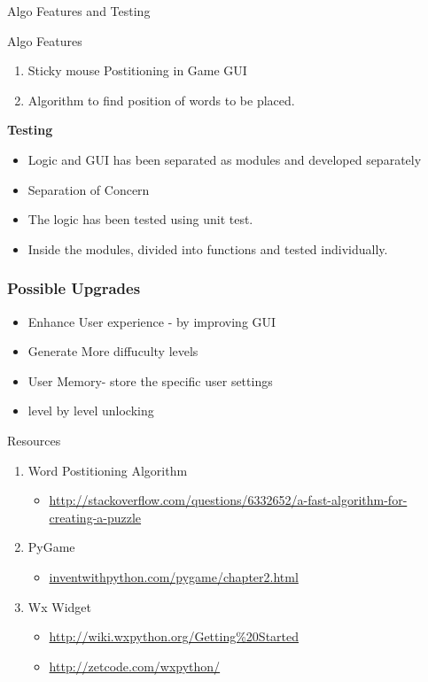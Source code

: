 \documentclass{beamer}
\begin{document}
\begin{frame}{Algo Features and Testing}
\begin{block}{Algo Features}
\begin{enumerate}
\item  Sticky mouse Postitioning in Game GUI
\item Algorithm to find position of words to be placed. 
\end{enumerate}
\textbf{Testing}
\begin{itemize}
\item Logic and GUI has been separated as modules and developed separately
\item Separation of Concern
\item The logic has been tested using unit test.
\item Inside the modules, divided into functions and tested individually.
\end{itemize}


\end{block}


\end{frame}



\begin{frame}
\frametitle{Possible Upgrades}

\begin{itemize}
\item Enhance User experience - by improving GUI
\item Generate More diffuculty levels
\item User Memory- store the specific user settings 
\item level by level unlocking
\end{itemize}

\end{frame}


\begin{frame}{Resources}
\begin{enumerate}

\item Word Postitioning Algorithm
\begin{itemize}[]
\item \url{http://stackoverflow.com/questions/6332652/a-fast-algorithm-for-creating-a-puzzle}
\end{itemize}

\item PyGame  
\begin{itemize}[]
\item \url{inventwithpython.com/pygame/chapter2.html}

\end{itemize}

\item Wx Widget
\begin{itemize}[]
\item \url{http://wiki.wxpython.org/Getting\%20Started}
\item \url{http://zetcode.com/wxpython/}
\end{itemize}

\end{enumerate}

\end{frame}
% 
\end{document}
